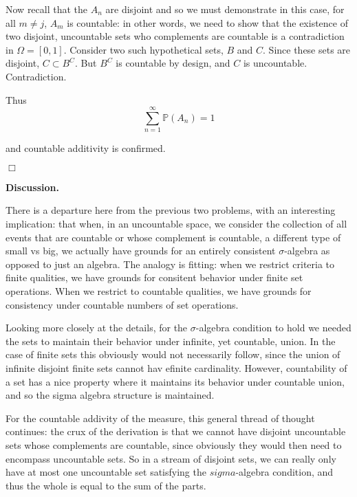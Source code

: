 \documentclass{article}
\begin{document}
\begin{enumerate}[\textbf{(a)}]
Now recall that the $A_n$ are disjoint and so we must demonstrate in this case, for all $m \neq j$, $A_m$ is countable: in other words, we need to show that the existence of two disjoint, uncountable sets who complements are countable is a contradiction in $\Omega = [0,1]$. Consider two such hypothetical sets, $B$ and $C$. Since these sets are disjoint, $C \subset B^C$. But $B^C$ is countable by design, and $C$ is uncountable. Contradiction.

Thus \[\sum_{n = 1}^\infty \mathbb{P}(A_n) = 1\] 

and countable additivity is confirmed. 

\end{enumerate}

\hfill $\Box$

\bigskip

\noindent \textbf{Discussion.} 

\medskip

There is a departure here from the previous two problems, with an interesting implication: that when, in an uncountable space, we consider the collection of all events that are countable or whose complement is countable, a different type of small vs big, we actually have grounds for an entirely consistent $\sigma$-algebra as opposed to just an algebra. The analogy is fitting: when we restrict criteria to finite qualities, we have grounds for consitent behavior under finite set operations. When we restrict to countable qualities, we have grounds for consistency under countable numbers of set operations. 

Looking more closely at the details, for the $\sigma$-algebra condition to hold we needed the sets to maintain their behavior under infinite, yet countable, union. In the case of finite sets this obviously would not necessarily follow, since the union of infinite disjoint finite sets cannot hav efinite cardinality. However, countability of a set has a nice property where it maintains its behavior under countable union, and so the sigma algebra structure is maintained. 

For the countable addivity of the measure, this general thread of thought continues: the crux of the derivation is that we cannot have disjoint uncountable sets whose complements are countable, since obviously they would then need to encompass uncountable sets. So in a stream of disjoint sets, we can really only have at most one uncountable set satisfying the $sigma$-algebra condition, and thus the whole is equal to the sum of the parts. 
\end{document}
